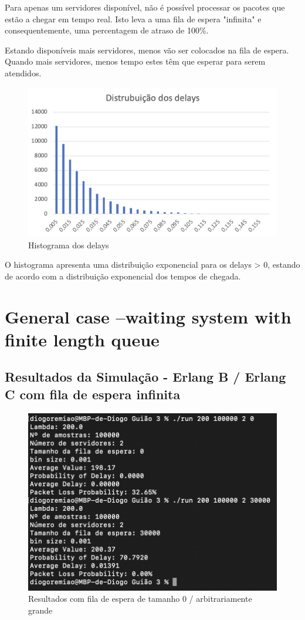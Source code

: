 Para apenas um servidores disponível, não é possível processar os pacotes que estão a chegar em tempo real.
Isto leva a uma fila de espera "infinita" e consequentemente, uma percentagem de atraso de 100\%.

Estando disponíveis mais servidores, menos vão ser colocados na fila de espera.
Quando mais servidores, menos tempo estes têm que esperar para serem atendidos.

\begin{figure}[H]
    \centering
    \includegraphics[width=.8\linewidth]{figs/image_8.png}
    \caption{Histograma dos delays}
    \label{fig:8}
\end{figure}

O histograma apresenta uma distribuição exponencial para os delays > 0, estando de acordo com a distribuição exponencial dos tempos de chegada.

\section*{General case –waiting system with finite length queue} \label{ex_3}

\subsection*{Resultados da Simulação - Erlang B / Erlang C com fila de espera infinita}

\begin{figure}[H]
    \centering
    \includegraphics[width=.8\linewidth]{figs/image_5.png}
    \caption{Resultados com fila de espera de tamanho 0 / arbitrariamente grande}
    \label{fig:5}
\end{figure}

